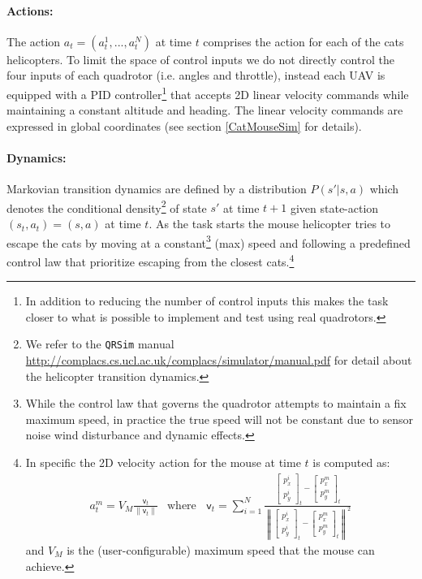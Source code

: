 \documentclass{article}
\newcommand{\webman}{\url{http://complacs.cs.ucl.ac.uk/complacs/simulator/manual.pdf}\xspace}
\begin{document}
\paragraph{Actions:} 
The action $a_t = (a^1_t,...,a^{N}_t)$ at time $t$ comprises the action for each of the cats helicopters. 
To limit the space of control inputs we do not directly control the four inputs of each quadrotor (i.e. angles and throttle), instead each UAV is equipped with a PID controller\footnote{In addition to reducing the number of control inputs this makes the task closer to what is possible to implement and test using real quadrotors.} that accepts 2D linear velocity commands while maintaining a constant altitude and heading. The linear velocity commands are expressed in global coordinates (see section \ref{CatMouseSim} for details).

\paragraph{Dynamics:} 
Markovian transition dynamics are defined by a distribution $P(s'|s,a)$ which denotes the conditional density\footnote{We refer to the \texttt{QRSim} manual \webman for detail about the helicopter transition dynamics.} of state $s'$ at time $t+1$ given state-action $(s_t,a_t)=(s,a)$ at
time $t$. As the task starts the mouse helicopter tries to escape the cats by moving at a constant\footnote{While the control law that governs the quadrotor attempts to maintain a fix maximum speed, in practice the true speed will not be constant due to sensor noise wind disturbance and dynamic effects.} (max) speed and following a predefined control law that prioritize escaping from the closest cats.\footnote{In specific the 2D velocity action for the mouse at time $t$ is computed as:
$$
\begin{array}{ll}
a^m_t = V_{M} \frac{\mathsf{v}_t}{\| \mathsf{v}_t \|} &
\text{where } \;\;\mathsf{v}_t = \sum_{i=1}^N \frac{\left[\begin{array}{c} p^i_x \\ p^i_y \end{array}\right]_t - \left[\begin{array}{c} p^m_x \\ p^m_y \end{array}\right]_t}{\left\| \left[\begin{array}{c} p^i_x \\ p^i_y \end{array}\right]_t - \left[\begin{array}{c} p^m_x \\ p^m_y \end{array}\right]_t \right\|^2}
\end{array}
$$
and $V_{M}$ is the (user-configurable) maximum speed that the mouse can achieve.  
}
\end{document}

